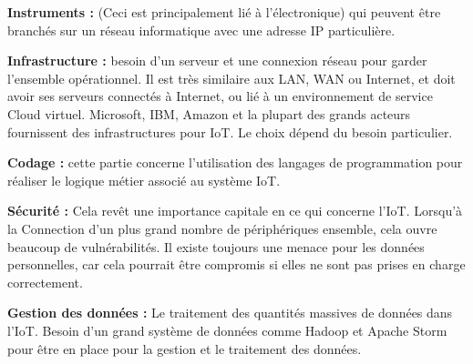\documentclass[12pt,a4paper]{report}
\begin{document}
\noindent \begin{flushleft}
	\textbf{Instruments : }(Ceci est principalement li\'{e} \`{a} l'\'{e}lectronique) qui peuvent \^{e}tre branch\'{e}s sur un r\'{e}seau informatique avec une adresse IP particuli\`{e}re.
	
	\noindent \textbf{Infrastructure : }besoin d'un serveur et une connexion r\'{e}seau pour garder l'ensemble op\'{e}rationnel. Il est tr\`{e}s similaire aux LAN, WAN ou Internet, et doit avoir ses serveurs connect\'{e}s \`{a} Internet, ou li\'{e} \`{a} un environnement de service Cloud virtuel. Microsoft, IBM, Amazon et la plupart des grands acteurs fournissent des infrastructures pour IoT. Le choix d\'{e}pend du besoin particulier.
	
	\noindent \textbf{Codage : }cette partie concerne l'utilisation des langages de programmation pour r\'{e}aliser le logique m\'{e}tier associ\'{e} au syst\`{e}me IoT.
	
	\noindent \textbf{S\'{e}curit\'{e} : }Cela rev\^{e}t une importance capitale en ce qui concerne l'IoT. Lorsqu'\`{a} la Connection d'un plus grand nombre de p\'{e}riph\'{e}riques ensemble, cela ouvre beaucoup de vuln\'{e}rabilit\'{e}s. Il existe toujours une menace pour les donn\'{e}es personnelles, car cela pourrait \^{e}tre compromis si elles ne sont pas prises en charge correctement.
\end{flushleft}

\noindent \textbf{Gestion des donn\'{e}es : }Le traitement des quantit\'{e}s massives de donn\'{e}es dans l'IoT. Besoin d'un grand syst\`{e}me de donn\'{e}es comme Hadoop et Apache Storm pour \^{e}tre en place pour la gestion et le traitement des donn\'{e}es.
\end{document}
